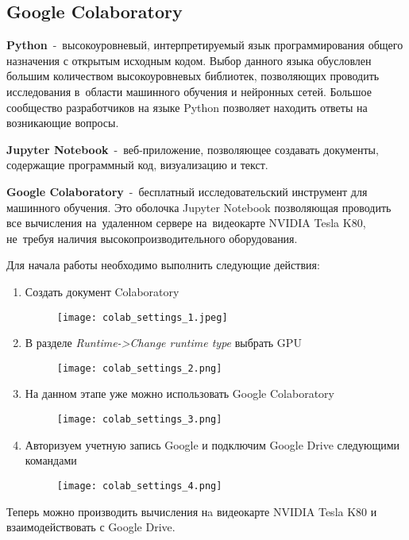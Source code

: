 \subsection{Google Colaboratory}

\textbf{Python}\cite{bib:python}~-~высокоуровневый, интерпретируемый язык программирования общего назначения с открытым исходным кодом.
Выбор данного языка обусловлен большим количеством высокоуровневых библиотек, позволяющих проводить исследования в~области машинного обучения и нейронных сетей.
Большое сообщество разработчиков на языке Python позволяет находить ответы на возникающие вопросы\cite{bib:why_python}.

\textbf{Jupyter Notebook}\cite{bib:jupyter}~-~веб-приложение, позволяющее создавать документы, содержащие программный код, визуализацию и текст.

\textbf{Google Colaboratory}\cite{bib:google_colab}\cite{bib:colab_settings}~-~бесплатный исследовательский инструмент для машинного обучения.
Это оболочка Jupyter Notebook позволяющая проводить все вычисления на~удаленном сервере на~видеокарте NVIDIA Tesla K80\cite{bib:nvidia_k80}, не~требуя наличия высокопроизводительного оборудования.

\newpage

Для начала работы необходимо выполнить следующие действия:
\begin{enumerate}\label{alg:colab_settings}
\item Создать документ Colaboratory
\begin{figure}[h]
    \centering
    \texttt{[image: colab\_settings\_1.jpeg]}
    \label{fig:colab_settings_1}
\end{figure}

\item В разделе \textsl{Runtime->Change runtime type} выбрать GPU
\begin{figure}[h]
    \centering
    \texttt{[image: colab\_settings\_2.png]}
    \label{fig:colab_settings_2}
\end{figure}

\newpage

\item На данном этапе уже можно использовать Google Colaboratory
\begin{figure}[h]
    \centering
    \texttt{[image: colab\_settings\_3.png]}
    \label{fig:colab_settings_3}
\end{figure}

\item Авторизуем учетную запись Google и подключим Google Drive следующими командами
\begin{figure}[h]
    \centering
    \texttt{[image: colab\_settings\_4.png]}
    \label{fig:colab_settings_4}
\end{figure}

\end{enumerate}

Теперь можно производить вычисления нa видеокарте NVIDIA Tesla K80 и взаимодействовать с Google Drive.

\newpage 